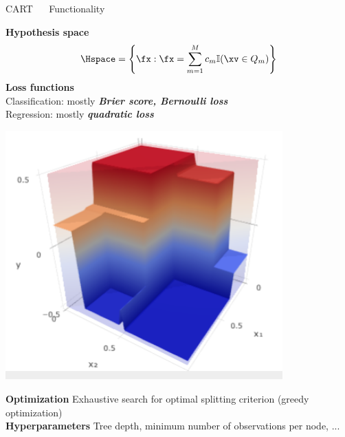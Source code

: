 \documentclass[11pt,compress,t,notes=noshow, xcolor=table]{beamer}
\begin{document}
\begin{frame}{\textcolor{gray!80}{CART} ~~ Functionality}
\begin{minipage}{0.6\textwidth}
  \textbf{\textcolor{gray!80}{Hypothesis space}} \\
  $$\Hspace = \left\{ \fx: \fx = \sum_{m = 1}^M c_m \mathbb{I}(\xv \in Q_m) 
  \right\}$$
  \medskip
  \textbf{\textcolor{gray!80}{Loss functions}} \\
  Classification: mostly \textit{\textbf{Brier score, Bernoulli loss}}  \\
  \medskip
  Regression: mostly \textit{\textbf{quadratic loss}}
\end{minipage}%
\begin{minipage}{0.4\textwidth}
  \includegraphics[width=0.8\textwidth]{figure/cart_3d.PNG}
\end{minipage}

\medskip
\textbf{\textcolor{gray!80}{Optimization}} {}{} Exhaustive search for optimal 
splitting criterion (greedy optimization) \\
\medskip
\textbf{\textcolor{gray!80}{Hyperparameters}} {}{} Tree depth, minimum number
of observations per node, ...

\end{frame}

\end{document}
